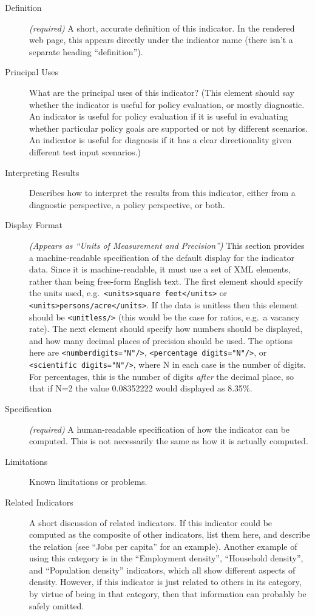 \begin{description}

\item[Definition] \emph{(required)} A short, accurate definition of this
indicator.  In the rendered web page, this appears directly under the
indicator name (there isn't a separate heading ``definition'').

\item[Principal Uses] What are the principal uses of this indicator?  (This
element should say whether the indicator is useful for policy evaluation,
or mostly diagnostic.  An indicator is useful for policy evaluation if it
is useful in evaluating whether particular policy goals are supported or not by
different scenarios.  An indicator is useful for diagnosis if it has a
clear directionality given different test input scenarios.)

\item[Interpreting Results] Describes how to interpret the results from
this indicator, either from a diagnostic perspective, a policy perspective,
or both.

\item[Display Format]
\emph{(Appears as ``Units of Measurement and Precision'')} This
section provides a machine-readable specification of the default
display for the indicator data.  Since it is machine-readable, it
must use a set of XML elements, rather than being free-form English
text.  The first element should specify the units used, e.g.\
\verb|<units>square feet</units>| or
\verb|<units>persons/acre</units>|.  If the data is unitless then
this element should be \verb|<unitless/>| (this would be the case
for ratios, e.g.\ a vacancy rate).  The next element should specify
how numbers should be displayed, and how many decimal places of
precision should be used.  The options here are
\verb|<numberdigits="N"/>|, \verb|<percentage digits="N"/>|, or
\verb|<scientific digits="N"/>|, where N in each case is the number
of digits.  For percentages, this is the number of digits
\emph{after} the decimal place, so that if N=2 the value 0.08352222
would displayed as 8.35\%.

\item[Specification] \emph{(required)} A human-readable specification of
how the indicator can be computed.  This is not necessarily the same as how
it is actually computed.

\item[Limitations] Known limitations or problems.

\item[Related Indicators] A short discussion of related indicators.  If
this indicator could be computed as the composite of other indicators, list
them here, and describe the relation (see ``Jobs per capita'' for an
example).  Another example of using this category is in the ``Employment
density'', ``Household density'', and ``Population density'' indicators,
which all show different aspects of density.  However, if this indicator is
just related to others in its category, by virtue of being in that
category, then that information can probably be safely omitted.


\end{description}
